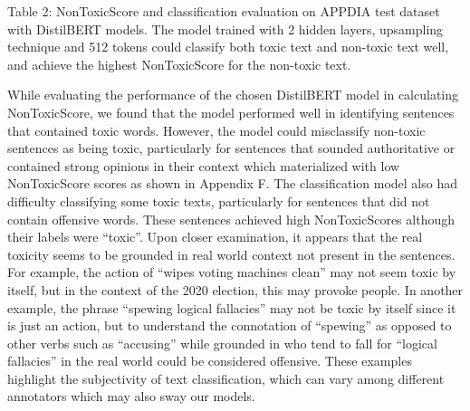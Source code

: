 \documentclass[11pt]{article}
\begin{document}
\begin{table*}[ht]
\centering
{}
Table 2:  NonToxicScore and classification evaluation on APPDIA test dataset with DistilBERT models. The model trained with 2 hidden layers, upsampling technique and 512 tokens could classify both toxic text and non-toxic text well, and achieve the highest NonToxicScore for the non-toxic text.
\end{table*}

While evaluating the performance of the chosen DistilBERT model in calculating NonToxicScore, we found that the model performed well in identifying sentences that contained toxic words. However, the model could misclassify non-toxic sentences as being toxic, particularly for sentences that sounded authoritative or contained strong opinions in their context which materialized with low NonToxicScore scores as shown in Appendix F. The classification model also had difficulty classifying some toxic texts, particularly for sentences that did not contain offensive words. These sentences achieved high NonToxicScores although their labels were “toxic”. Upon closer examination, it appears that the real toxicity seems to be grounded in real world context not present in the sentences. For example, the action of “wipes voting machines clean” may not seem toxic by itself, but in the context of the 2020 election, this may provoke people. In another example, the phrase “spewing logical fallacies” may not be toxic by itself since it is just an action, but to understand the connotation of “spewing” as opposed to other verbs such as “accusing” while grounded in who tend to fall for “logical fallacies” in the real world could be considered offensive. These examples highlight the subjectivity of text classification, which can vary among different  annotators which may also sway our models.
\end{document}
